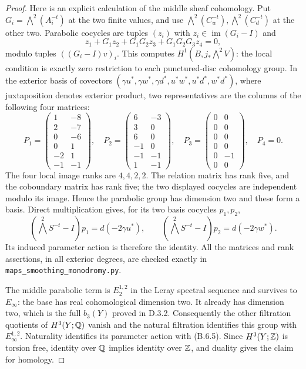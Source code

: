 \begin{proof}
Here is an explicit calculation of the middle sheaf cohomology. Put
$G_i=\bigwedge^2(A_i^{-t})$ at the two finite values, and use
$\bigwedge^2(C_w^{-t}),\bigwedge^2(C_d^{-t})$ at the other two.
Parabolic cocycles are tuples $(z_i)$ with
$z_i\in\operatorname{im}(G_i-I)$ and
\[
 z_1+G_1z_2+G_1G_2z_3+G_1G_2G_3z_4=0,
\]
modulo tuples $((G_i-I)v)_i$. This computes
$H^1(B,j_*\bigwedge^2V)$: the local condition is exactly zero
restriction to each punctured-disc cohomology group.
In the exterior basis of covectors
$(\gamma u^*,\gamma w^*,\gamma d^*,u^*w^*,u^*d^*,w^*d^*)$,
where juxtaposition denotes exterior product, two representatives
are the columns of the following four matrices:
\[
 P_1=\begin{pmatrix}1&-8\\2&-7\\0&-6\\0&1\\-2&1\\-1&-1\end{pmatrix},
 \quad
 P_2=\begin{pmatrix}6&-3\\3&0\\6&0\\-1&0\\-1&-1\\1&-1\end{pmatrix},
 \quad
 P_3=\begin{pmatrix}0&0\\0&0\\0&0\\0&0\\0&-1\\0&0\end{pmatrix},
 \quad P_4=0.
 \tag{B.6.4}
\]
The four local image ranks are $4,4,2,2$. The relation matrix
has rank five, and the coboundary matrix has rank five; the two
displayed cocycles are independent modulo its image. Hence the
parabolic group has dimension two and these form a basis. Direct
multiplication gives, for its two basis cocycles $p_1,p_2$,
\[
 (\bigwedge^2S^{-t}-I)p_1=d(-2\gamma u^*),\qquad
 (\bigwedge^2S^{-t}-I)p_2=d(-2\gamma w^*).
 \tag{B.6.5}
\]
Its induced parameter action is therefore the identity. All the
matrices and rank assertions, in all exterior degrees, are checked
exactly in \texttt{maps\_smoothing\_monodromy.py}.

The middle parabolic term is $E_2^{1,2}$ in the Leray spectral
sequence and survives to $E_\infty$: the base has real cohomological
dimension two. It already has dimension two, which is the full
$b_3(Y)$ proved in D.3.2. Consequently the other filtration quotients
of $H^3(Y;\mathbb Q)$ vanish and the natural filtration identifies this
group with $E_\infty^{1,2}$. Naturality identifies its parameter
action with (B.6.5). Since $H^3(Y;\mathbb Z)$ is torsion free, identity
over $\mathbb Q$ implies identity over $\mathbb Z$, and duality gives the claim
for homology.
\end{proof}

